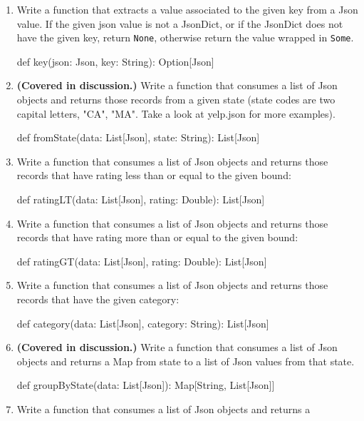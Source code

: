 \begin{enumerate}
    \item Write a function that extracts a value associated to the given key
    from a Json value. If the given json value is not a JsonDict, or if the
    JsonDict does not have the given key, return \verb|None|, otherwise return
    the value wrapped in \verb|Some|.
    \begin{scalacode}
    def key(json: Json, key: String): Option[Json]
    \end{scalacode}
    \item \textbf{(Covered in discussion.)} Write a function that consumes a
    list of Json objects and returns those records from a given state (state
    codes are two capital letters, "CA", "MA". Take a look at yelp.json for
    more examples).
    \begin{scalacode}
    def fromState(data: List[Json], state: String): List[Json]
    \end{scalacode}
    \item Write a function that consumes a list of Json objects and returns
    those records that have rating less than or equal to the given bound:
    \begin{scalacode}
    def ratingLT(data: List[Json], rating: Double): List[Json]
    \end{scalacode}
    \item Write a function that consumes a list of Json objects and returns
    those records that have rating more than or equal to the given bound:
    \begin{scalacode}
    def ratingGT(data: List[Json], rating: Double): List[Json]
    \end{scalacode}
    \item Write a function that consumes a list of Json objects and returns
    those records that have the given category:
    \begin{scalacode}
    def category(data: List[Json], category: String): List[Json]
    \end{scalacode}
    \item \textbf{(Covered in discussion.)} Write a function that consumes a
    list of Json objects and returns a Map from state to a list of Json values
    from that state.
    \begin{scalacode}
    def groupByState(data: List[Json]): Map[String, List[Json]]
    \end{scalacode}
    \item Write a function that consumes a list of Json objects and returns a

\end{enumerate}

